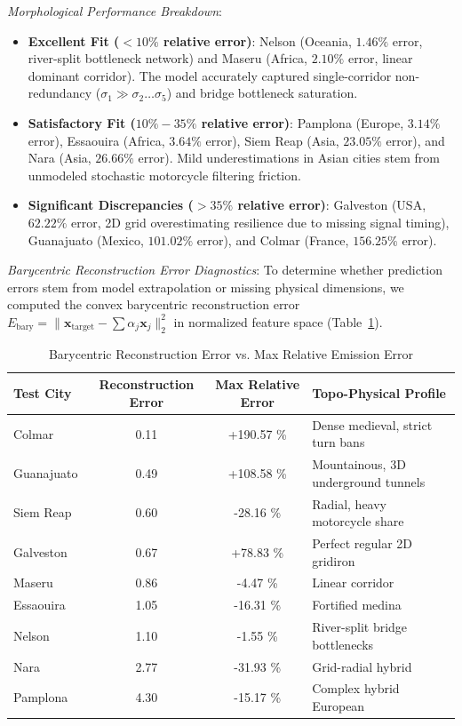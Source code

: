 \documentclass[lettersize,journal]{IEEEtran}
\begin{document}
\textit{Morphological Performance Breakdown}:
\begin{itemize}
    \item \textbf{Excellent Fit ($<10\%$ relative error)}: Nelson (Oceania, $1.46\%$ error, river-split bottleneck network) and Maseru (Africa, $2.10\%$ error, linear dominant corridor). The model accurately captured single-corridor non-redundancy ($\sigma_1 \gg \sigma_2 \dots \sigma_5$) and bridge bottleneck saturation.
    \item \textbf{Satisfactory Fit ($10\% - 35\%$ relative error)}: Pamplona (Europe, $3.14\%$ error), Essaouira (Africa, $3.64\%$ error), Siem Reap (Asia, $23.05\%$ error), and Nara (Asia, $26.66\%$ error). Mild underestimations in Asian cities stem from unmodeled stochastic motorcycle filtering friction.
    \item \textbf{Significant Discrepancies ($>35\%$ relative error)}: Galveston (USA, $62.22\%$ error, 2D grid overestimating resilience due to missing signal timing), Guanajuato (Mexico, $101.02\%$ error), and Colmar (France, $156.25\%$ error). 
\end{itemize}

\textit{Barycentric Reconstruction Error Diagnostics}: To determine whether prediction errors stem from model extrapolation or missing physical dimensions, we computed the convex barycentric reconstruction error $E_{\text{bary}} = \|\mathbf{x}_{\text{target}} - \sum \alpha_j \mathbf{x}_j\|_2^2$ in normalized feature space (Table~\ref{tab:barycentric}).

\begin{table}[htbp]
\caption{Barycentric Reconstruction Error vs. Max Relative Emission Error}
\label{tab:barycentric}
\centering
\begin{tabular}{lccl}
\toprule
Test City & Reconstruction Error & Max Relative Error & Topo-Physical Profile \\
\midrule
Colmar & 0.11 & +190.57 \% & Dense medieval, strict turn bans \\
Guanajuato & 0.49 & +108.58 \% & Mountainous, 3D underground tunnels \\
Siem Reap & 0.60 & -28.16 \% & Radial, heavy motorcycle share \\
Galveston & 0.67 & +78.83 \% & Perfect regular 2D gridiron \\
Maseru & 0.86 & -4.47 \% & Linear corridor \\
Essaouira & 1.05 & -16.31 \% & Fortified medina \\
Nelson & 1.10 & -1.55 \% & River-split bridge bottlenecks \\
Nara & 2.77 & -31.93 \% & Grid-radial hybrid \\
Pamplona & 4.30 & -15.17 \% & Complex hybrid European \\
\bottomrule
\end{tabular}
\end{table}
\end{document}
